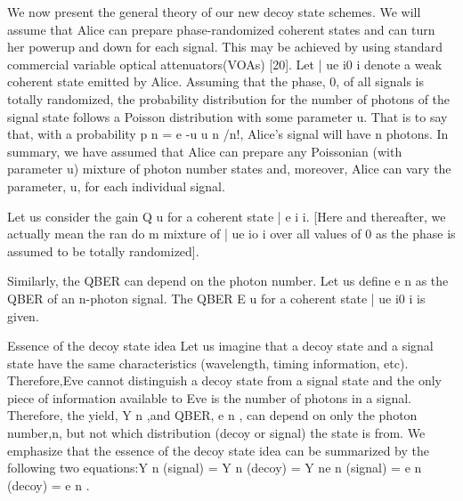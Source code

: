 We now present the general theory of our new decoy state schemes. We will assume that Alice can prepare phase-randomized coherent states and can turn her powerup and down for each signal. This may be achieved by using standard commercial variable optical attenuators(VOAs) [20]. Let | ue i0 i denote a weak coherent state emitted by Alice. Assuming that the phase, 0, of all signals is totally randomized, the probability distribution for the number of photons of the signal state follows a Poisson distribution with some parameter u. That is to say that, with a probability p n = e -u u n /n!, Alice’s signal will have n photons. In summary, we have assumed that Alice can prepare any Poissonian (with parameter u) mixture of photon number states and, moreover, Alice can vary the parameter, u, for each individual signal.

Let us consider the gain Q u for a coherent state
| e i i. [Here and thereafter, we actually mean the ran
do m mixture of | ue io i over all values of 0 as the phase is assumed to be totally randomized].

Similarly, the QBER can depend on the photon number. Let us define e n as the QBER of an n-photon signal. The QBER E u for a coherent state | ue i0 i is given.

Essence of the decoy state idea Let us imagine that a decoy state and a signal state have the same characteristics (wavelength, timing information, etc). Therefore,Eve cannot distinguish a decoy state from a signal state and the only piece of information available to Eve is the number of photons in a signal. Therefore, the yield, Y n ,and QBER, e n , can depend on only the photon number,n, but not which distribution (decoy or signal) the state is from. We emphasize that the essence of the decoy state idea can be summarized by the following two equations:Y n (signal) = Y n (decoy) = Y ne n (signal) = e n (decoy) = e n .

